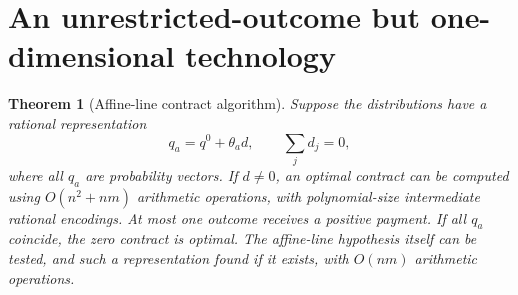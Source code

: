 \documentclass[11pt]{article}
\newtheorem{theorem}{Theorem}
\theoremstyle{definition}
\begin{document}
\section{An unrestricted-outcome but one-dimensional technology}
\begin{theorem}[Affine-line contract algorithm]
Suppose the distributions have a rational representation
\[
 q_a=q^0+\theta_a d,\qquad \sum_jd_j=0,
\]
where all $q_a$ are probability vectors. If $d\ne0$, an optimal contract can
be computed using $O(n^2+nm)$ arithmetic operations, with polynomial-size
intermediate rational encodings. At most one outcome receives a positive
payment. If all $q_a$ coincide, the zero contract is optimal.
The affine-line hypothesis itself can be tested, and such a representation
found if it exists, with $O(nm)$ arithmetic operations.
\end{theorem}
\end{document}
